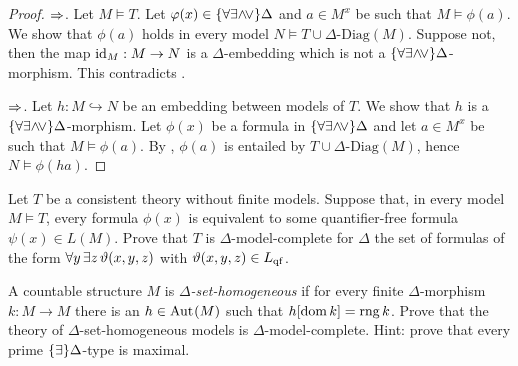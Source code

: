 \begin{proof}
$\Rightarrow$. 
Let $M\models T$. Let $\varphi(x)\in \{\forall\exists{\wedge}{\!\vee}\}\Delta$ and $a\in M^x$ be such that $M\models\phi(a)$.
We show that $\phi(a)$ holds in every model $N\models T\cup\Delta\mbox{-Diag}(M)$.
Suppose not,  then the map ${\rm id}_M:M\to N$ is a $\Delta$-embedding which is not a $\{\forall\exists{\wedge}{\!\vee}\}\Delta$-morphism.
This contradicts .

$\Rightarrow$. Let $h:M\hookrightarrow N$ be an embedding between models of $T$. We show that $h$ is a $\{\forall\exists{\wedge}{\!\vee}\}\Delta$-morphism.
Let $\phi(x)$ be a formula in $\{\forall\exists{\wedge}{\!\vee}\}\Delta$ and let $a\in M^x$ be such that $M\models\phi(a)$.
By , $\phi(a)$ is entailed by $T\cup\Delta\mbox{-Diag}(M)$, hence $N\models\phi(h a)$.
\end{proof}

\begin{exercise}
  Let $T$ be a consistent theory without finite models.
  Suppose that, in every model $M\models T$, every formula $\phi(x)$ is equivalent to some quantifier-free formula $\psi(x)\in L(M)$.
  Prove that $T$ is $\Delta$-model-complete for $\Delta$ the set of formulas of the form $\forall y\,\exists z\,\vartheta(x,y,z)$ with $\vartheta(x,y,z)\in L_{\rm qf}$.
\end{exercise}

\begin{exercise}
A countable structure $M$ is $\Delta$\textit{-set-homogeneous\/} if for every finite $\Delta$-mor\-phism $k:M\to M$ there is an $h\in{\rm Aut\kern.15ex}(M)$ such that $h[\mathop{\rm dom} k]=\mathop{\rm rng} k$.
Prove that %
the theory of $\Delta$-set-homogeneous models is $\Delta$-model-complete.
Hint: prove that every prime $\{\exists\}\Delta$-type is maximal.
\end{exercise}


